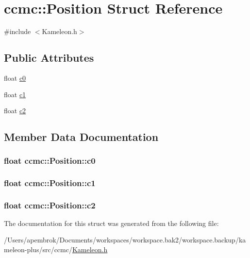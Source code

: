 \hypertarget{structccmc_1_1_position}{\section{ccmc\-:\-:Position Struct Reference}
\label{structccmc_1_1_position}
}


{\ttfamily \#include $<$Kameleon.\-h$>$}

\subsection*{Public Attributes}
\begin{DoxyCompactItemize}
\item 
float \hyperlink{structccmc_1_1_position_a0b395e8f55e11c77b1246aaaad583640}{c0}
\item 
float \hyperlink{structccmc_1_1_position_a3c33c74bbff85c9476f5107b53d26012}{c1}
\item 
float \hyperlink{structccmc_1_1_position_ae38598bba39f42e5dbade94f209b58ca}{c2}
\end{DoxyCompactItemize}


\subsection{Member Data Documentation}
\hypertarget{structccmc_1_1_position_a0b395e8f55e11c77b1246aaaad583640}{
\subsubsection[{c0}]{\setlength{\rightskip}{0pt plus 5cm}float ccmc\-::\-Position\-::c0}}\label{structccmc_1_1_position_a0b395e8f55e11c77b1246aaaad583640}
\hypertarget{structccmc_1_1_position_a3c33c74bbff85c9476f5107b53d26012}{
\subsubsection[{c1}]{\setlength{\rightskip}{0pt plus 5cm}float ccmc\-::\-Position\-::c1}}\label{structccmc_1_1_position_a3c33c74bbff85c9476f5107b53d26012}
\hypertarget{structccmc_1_1_position_ae38598bba39f42e5dbade94f209b58ca}{
\subsubsection[{c2}]{\setlength{\rightskip}{0pt plus 5cm}float ccmc\-::\-Position\-::c2}}\label{structccmc_1_1_position_ae38598bba39f42e5dbade94f209b58ca}


The documentation for this struct was generated from the following file\-:\begin{DoxyCompactItemize}
\item 
/\-Users/apembrok/\-Documents/workspaces/workspace.\-bak2/workspace.\-backup/kameleon-\/plus/src/ccmc/\hyperlink{_kameleon_8h}{Kameleon.\-h}\end{DoxyCompactItemize}
